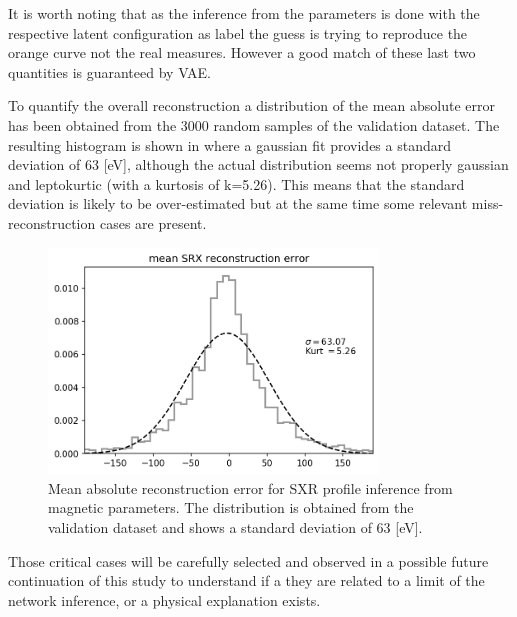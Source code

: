It is worth noting that as the inference from the parameters is done with the respective latent configuration as label the guess is trying to reproduce the orange curve not the real measures. However a good match of these last two quantities is guaranteed by VAE.


To quantify the overall reconstruction a distribution of the mean absolute error has been obtained from the 3000 random samples of the validation dataset. The resulting histogram is shown in \Figure{\ref{fig:mae_histogram}} where a gaussian fit provides a standard deviation of 63 [eV], although the actual distribution seems not properly gaussian and leptokurtic (with a kurtosis of k=5.26). This means that the standard deviation is likely to be over-estimated but at the same time some relevant miss-reconstruction cases are present.
%
\begin{figure}
    \centering
    \includegraphics[height=6cm]{img/STEP12_7c/Mean_Absolute_Error.png}
    \caption{Mean absolute reconstruction error for SXR profile inference from magnetic parameters. The distribution is obtained from the validation dataset and shows a standard deviation of 63 [eV]. }
    \label{fig:mae_histogram}
\end{figure}
%
Those critical cases will be carefully selected and observed in a possible future continuation of this study to understand if a they are related to a limit of the network inference, or a physical explanation exists.





